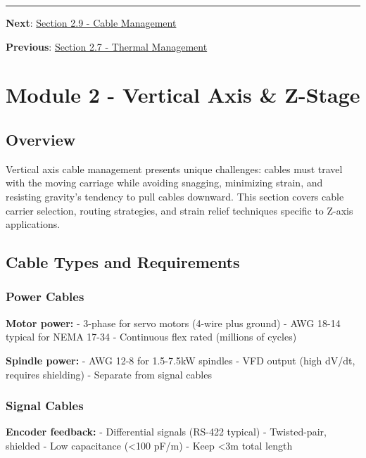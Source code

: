 \documentclass[
]{article}
\begin{document}
\begin{center}\rule{0.5\linewidth}{0.5pt}\end{center}

\textbf{Next}: \href{section-2.9-cable-management.md}{Section 2.9 -
Cable Management}

\textbf{Previous}: \href{section-2.7-thermal-management.md}{Section 2.7
- Thermal Management}

\newpage

\section{Module 2 - Vertical Axis \&
Z-Stage}\label{module-2---vertical-axis-z-stage-6}

\subsection{Overview}\label{overview-5}

Vertical axis cable management presents unique challenges: cables must
travel with the moving carriage while avoiding snagging, minimizing
strain, and resisting gravity's tendency to pull cables downward. This
section covers cable carrier selection, routing strategies, and strain
relief techniques specific to Z-axis applications.

\subsection{Cable Types and
Requirements}\label{cable-types-and-requirements}

\subsubsection{Power Cables}\label{power-cables}

\textbf{Motor power:} - 3-phase for servo motors (4-wire plus ground) -
AWG 18-14 typical for NEMA 17-34 - Continuous flex rated (millions of
cycles)

\textbf{Spindle power:} - AWG 12-8 for 1.5-7.5kW spindles - VFD output
(high dV/dt, requires shielding) - Separate from signal cables

\subsubsection{Signal Cables}\label{signal-cables}

\textbf{Encoder feedback:} - Differential signals (RS-422 typical) -
Twisted-pair, shielded - Low capacitance (\textless100 pF/m) - Keep
\textless3m total length
\end{document}
